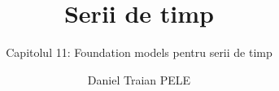 \title[Serii de timp]{Serii de timp}
\subtitle{Capitolul 11: Foundation models pentru serii de timp}
\author[D.T. Pele]{Daniel Traian PELE}
\date{}

\providecommand{\tsaapplink}[3]{\hypertarget{#2}{}\hyperlink{#1}{\beamergotobutton{#3}}}  %
\providecommand{\tsaappback}[2]{\begin{tikzpicture}[remember picture,overlay]\node[anchor=south east] at ([xshift=-3mm,yshift=7mm]current page.south east){\hyperlink{#1}{\beamerreturnbutton{#2}}};\end{tikzpicture}}  %
\providecommand{\tsachlink}[2]{\href{#1}{#2}}  %
\providecommand{\tsachlinkt}[2]{\href{#1}{\usebeamercolor[fg]{frametitle}#2}}  %


